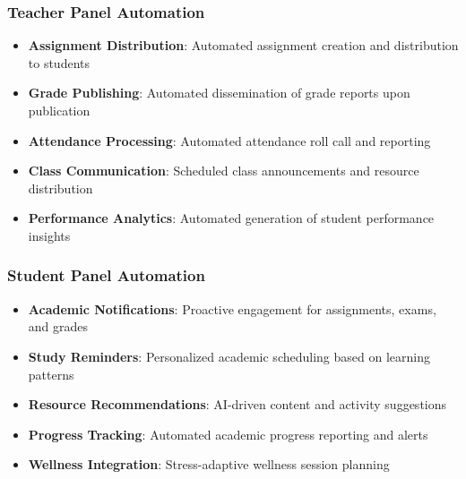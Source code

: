 \subsubsection{Teacher Panel Automation}

\begin{itemize}
    \item \textbf{Assignment Distribution}: Automated assignment creation and distribution to students
    \item \textbf{Grade Publishing}: Automated dissemination of grade reports upon publication
    \item \textbf{Attendance Processing}: Automated attendance roll call and reporting
    \item \textbf{Class Communication}: Scheduled class announcements and resource distribution
    \item \textbf{Performance Analytics}: Automated generation of student performance insights
\end{itemize}

\subsubsection{Student Panel Automation}

\begin{itemize}
    \item \textbf{Academic Notifications}: Proactive engagement for assignments, exams, and grades
    \item \textbf{Study Reminders}: Personalized academic scheduling based on learning patterns
    \item \textbf{Resource Recommendations}: AI-driven content and activity suggestions
    \item \textbf{Progress Tracking}: Automated academic progress reporting and alerts
    \item \textbf{Wellness Integration}: Stress-adaptive wellness session planning
\end{itemize}


